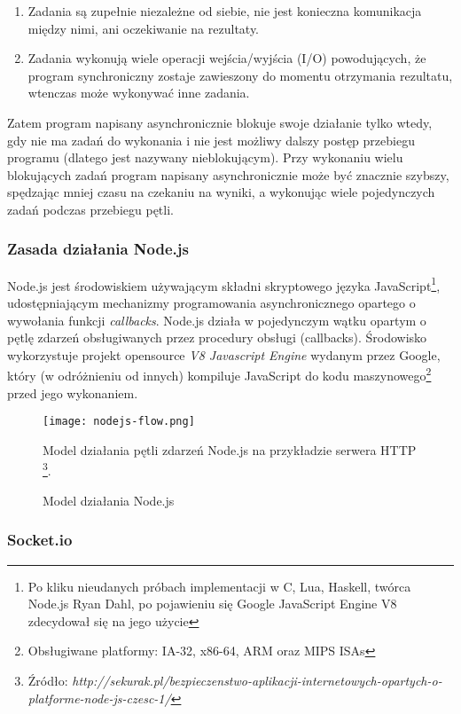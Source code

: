 \begin{enumerate}
  \item Zadania są zupełnie niezależne od siebie, nie jest konieczna komunikacja między nimi, ani oczekiwanie na rezultaty.
  \item Zadania wykonują wiele operacji wejścia/wyjścia (I/O) powodujących, że program synchroniczny zostaje zawieszony do momentu otrzymania rezultatu, wtenczas może wykonywać inne zadania.
\end{enumerate}

Zatem program napisany asynchronicznie blokuje swoje działanie tylko wtedy, gdy nie ma zadań do wykonania i nie jest możliwy dalszy postęp przebiegu programu (dlatego jest nazywany nieblokującym). Przy wykonaniu wielu blokujących zadań program napisany asynchronicznie może być znacznie szybszy, spędzając mniej czasu na czekaniu na wyniki, a wykonując wiele pojedynczych zadań podczas przebiegu pętli.

\subsubsection{Zasada działania Node.js}
\label{sub:tool-server-nodejs}

Node.js jest środowiskiem używającym składni skryptowego języka JavaScript\footnote{Po kliku nieudanych próbach implementacji w C, Lua,  Haskell, twórca Node.js Ryan Dahl, po pojawieniu się Google JavaScript Engine V8 zdecydował się na jego użycie}, udostępniającym mechanizmy programowania asynchronicznego opartego o wywołania funkcji \mbox{\emph{callbacks}}. Node.js działa w pojedynczym wątku opartym o pętlę zdarzeń obsługiwanych przez procedury obsługi (callbacks). Środowisko wykorzystuje projekt opensource \emph{V8 Javascript Engine} wydanym przez Google, który (w odróżnieniu od innych) kompiluje JavaScript do kodu maszynowego\footnote{Obsługiwane platformy: IA-32, x86-64, ARM oraz MIPS ISAs} przed jego wykonaniem.

\begin{figure}[H]
  \centering
    \texttt{[image: nodejs-flow.png]}
  \caption[Model działania Node.js]{Model działania Node.js}
  Model działania pętli zdarzeń Node.js na przykładzie serwera HTTP \footnote{Źródło: \emph{http://sekurak.pl/bezpieczenstwo-aplikacji-internetowych-opartych-o-platforme-node-js-czesc-1/}}.
\end{figure}

\subsubsection{Socket.io}
\label{subsub:socketio}


